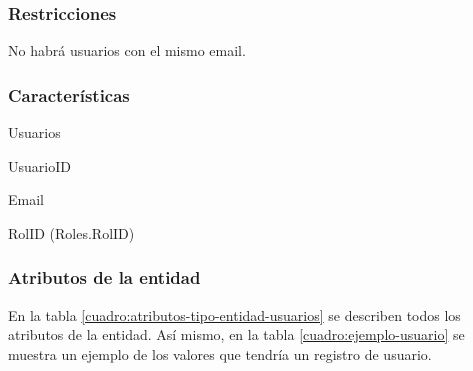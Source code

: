\subsubsection*{Restricciones}
No habrá usuarios con el mismo email.

\subsubsection*{Características}
\begin{description}[nosep,style=multiline,labelindent=0.8cm,leftmargin=4.5cm,font=\normalfont]
    \item[Nombre] Usuarios
    \item[Id. principal] UsuarioID
    \item[Id. alternativo] Email
    \item[Atrib. heredados] RolID (Roles.RolID)
\end{description}

\subsubsection*{Atributos de la entidad}
En la tabla \ref{cuadro:atributos-tipo-entidad-usuarios} se describen todos los atributos de la entidad. Así mismo, en la tabla \ref{cuadro:ejemplo-usuario} se muestra un ejemplo de los valores que tendría un registro de usuario.

